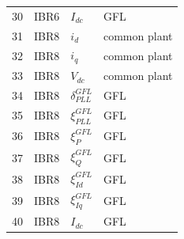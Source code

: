\begin{longtable}{@{}r l l l@{}}
30 & IBR6 & $I_{dc}$ & GFL \\ 
31 & IBR8 & $i_d$ & common plant \\ 
32 & IBR8 & $i_q$ & common plant \\ 
33 & IBR8 & $V_{dc}$ & common plant \\ 
34 & IBR8 & $\delta_{PLL}^{GFL}$ & GFL \\ 
35 & IBR8 & $\xi_{PLL}^{GFL}$ & GFL \\ 
36 & IBR8 & $\xi_{P}^{GFL}$ & GFL \\ 
37 & IBR8 & $\xi_{Q}^{GFL}$ & GFL \\ 
38 & IBR8 & $\xi_{Id}^{GFL}$ & GFL \\ 
39 & IBR8 & $\xi_{Iq}^{GFL}$ & GFL \\ 
40 & IBR8 & $I_{dc}$ & GFL \\ 
\bottomrule
\end{longtable}
